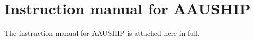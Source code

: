 \chapter{Instruction manual for AAUSHIP}
The instruction manual for AAUSHIP is attached here in full.


